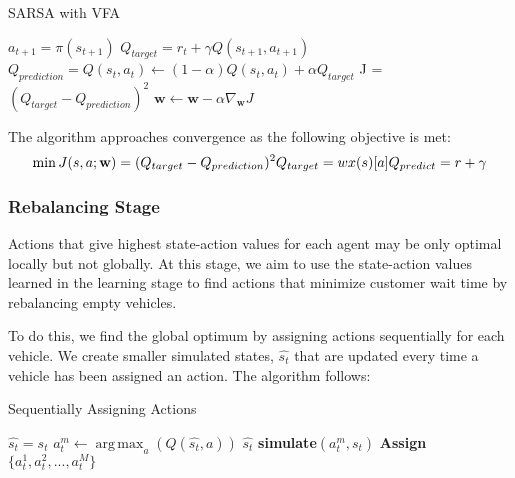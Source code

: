 \documentclass[letterpaper, 10 pt, conference]{ieeeconf}  %
\DeclareMathOperator*{\argmax}{arg\,max}
\begin{document}
\begin{algorithm}[H]
\caption{SARSA with VFA}
\begin{algorithmic}
    \State $a_{t+1} = \pi(s_{t+1})$
    \State $Q_{target} = r_t+\gamma  Q(s_{t+1},a_{t+1})$
    \State  $Q_{prediction} = Q(s_t,a_t) \leftarrow (1-\alpha) Q(s_t,a_t)+\alpha Q_{target}$
    \State J = $(Q_{target} - Q_{prediction})^2$
    \State $\textbf{w} \leftarrow \textbf{w} - \alpha \nabla_{ \textbf{w}} J$
\EndFor
\end{algorithmic}
\end{algorithm}


The algorithm approaches convergence as the following objective is met:
\begin{equation}
        \min J(s,a;\textbf{w}) = (Q_{target} - Q_{prediction})^2\\
        Q_{target} = w x(s)[a]\\
        Q_{predict} = r + \gamma 
\end{equation}


\subsubsection{Rebalancing Stage}
Actions that give highest state-action values for each agent may be only optimal locally but not globally. At this stage, we aim to use the state-action values learned in the learning stage to find actions that minimize customer wait time by rebalancing empty vehicles. 

To do this, we find the global optimum by assigning actions sequentially for each vehicle. We create smaller simulated states, $\hat{s_t}$ that are updated every time a vehicle has been assigned an action. The algorithm follows: 
\begin{algorithm}[H]
\caption{Sequentially Assigning Actions}
\begin{algorithmic}
    \State $\hat{s_t}=s_t$
            \State $a_t^m \leftarrow \argmax_a(Q(\hat{s_t},a))$
            \State $\hat{s_t}$ \leftarrow \textbf{simulate}$(a^m_t,s_t)$
        \EndIf
    \EndFor
    \State\textbf{Assign} $\{a^1_t,a^2_t,...,a^M_t\}$
\EndFor
\end{algorithmic}
\end{algorithm}
\end{document}
